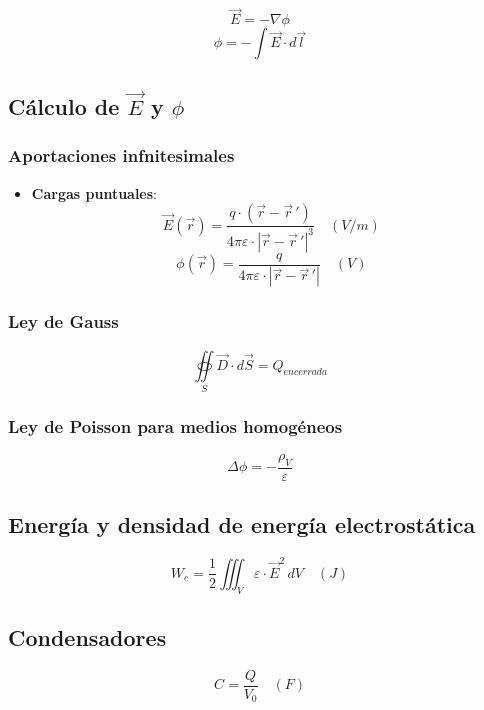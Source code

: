 \documentclass[12pt,a4paper]{article}
\begin{document}
\[ \vec{E} = - \nabla \phi \]
\[ \phi = - \int \vec{E} \cdot d \vec{l} \]

\subsection{Cálculo de $ \vec{E} $ y $ \phi $ }
\label{sub:calculo_de_e_y_phi_}

\subsubsection{Aportaciones infnitesimales}
\label{ssub:aportaciones_infnitesimales}

\begin{itemize}
		\item \textbf{Cargas puntuales}:
				\[ \vec{E}( \vec{r} ) = \frac{q \cdot ( \vec{r} - \vec{r}\,' )}{4 \pi \varepsilon \cdot | \vec{r} - \vec{r}\,' |^3} \quad (V/m) \]
				\[ \phi ( \vec{r} ) = \frac{q}{4 \pi \varepsilon \cdot | \vec{r} - \vec{r}\,' |} \quad (V) \]
\end{itemize}

\subsubsection{Ley de Gauss}
\label{ssub:ley_de_gauss}

\[ \oiint\limits_{S} \vec{D} \cdot d \vec{S} =  Q_{encerrada} \]

\subsubsection{Ley de Poisson para medios homogéneos}
\label{ssub:ley_de_poisson_para_medios_homogeneos}

\[ \Delta \phi = - \frac{\rho_V}{ \varepsilon } \]

\subsection{Energía y densidad de energía electrostática}
\label{sub:energia_y_densidad_de_energia_electrostatica}

\[ W_e = \frac{1}{2} \iiint_V \varepsilon \cdot \vec{E}^2 \, dV \quad (J) \]

\subsection{Condensadores}
\label{sub:condensadores}

\[ C = \frac{Q}{V_0} \quad (F) \]
\end{document}
